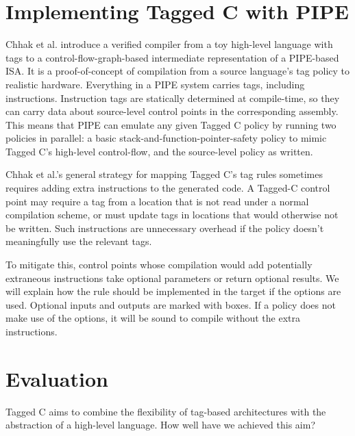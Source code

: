 \documentclass{llncs}
\begin{document}
{%
  


\section{Implementing Tagged C with PIPE}
\label{sec:optionals}

Chhak et al. \cite{Chhak21:Tagine} introduce a verified compiler from a toy
high-level language with tags
to a control-flow-graph-based intermediate representation of a PIPE-based
ISA. It is a proof-of-concept of compilation from a source language's tag policy to
realistic hardware. Everything in a PIPE system carries tags, including instructions. 
Instruction tags are statically determined at compile-time, so they can carry data about source-level
control points in the corresponding assembly. This means that PIPE can emulate any given Tagged C
policy by running two policies in parallel: a basic stack-and-function-pointer-safety policy to mimic Tagged C's
high-level control-flow, and the source-level policy as written.

Chhak et al.'s general strategy for mapping Tagged C's tag rules sometimes requires adding extra
instructions to the generated code. A Tagged-C control point
may require a tag from a location that is not read under a normal compilation scheme, or must update tags
in locations that would otherwise not be written. Such instructions are unnecessary overhead if the policy
doesn't meaningfully use the relevant tags.

To mitigate this, control points whose compilation would add potentially extraneous instructions
take optional parameters or return optional results. We will explain how the rule should be
implemented in the target if the options are used.
Optional inputs and outputs are marked with boxes. If a policy does not make use of the options, it will
be sound to compile without the extra instructions.

\section{Evaluation}
\label{sec:evaluation}

Tagged C aims to combine the flexibility of tag-based architectures with the abstraction
of a high-level language. How well have we achieved this aim?

}
\end{document}
